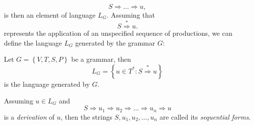 \begin{equation}
	S \Rightarrow \dots \Rightarrow u,
\end{equation}
is then an element of language $L_G$.
Assuming that 
\begin{equation}
	S \overset{*}{\Rightarrow} u.
\end{equation}
represents the application of an unspecified sequence of productions, we can define the language $L_G$ generated by the grammar $G$:
\begin{definition}[Language]
	Let $G = \left\{V, T, S, P\right\}$ be a grammar, then
	\begin{equation}
		L_G = \left\{u \in T^* : S \overset{*}{\Rightarrow} u\right\}
	\end{equation}
is the language generated by $G$.
\end{definition}
Assuming $u \in L_G$ and 
\begin{equation}
	S \Rightarrow u_1 \Rightarrow u_2 \Rightarrow \dots \Rightarrow u_n \Rightarrow u
\end{equation}
is a \emph{derivation} of $u$, then the strings $S, u_1, u_2, \dots, u_n$ are called its \emph{sequential forms}.
